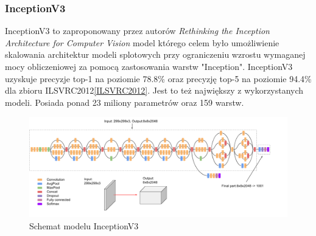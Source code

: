 \documentclass[
    left=2.5cm,         %
    right=2.5cm,        %
    top=2.5cm,          %
    bottom=3cm,         %
    bindingoffset=6mm,  %
    nohyphenation=false %
]{eiti/eiti-thesis}
\begin{document}
        \subsubsection{InceptionV3}\label{InceptionV3}
            InceptionV3 to zaproponowany przez autorów
            \textit{Rethinking the Inception Architecture for Computer Vision}\cite{DBLP:journals/corr/SzegedyVISW15}
            model którego celem było umożliwienie skalowania architektur modeli splotowych przy ograniczeniu wzrostu
            wymaganej mocy obliczeniowej za pomocą zastosowania warstw "Inception".
            InceptionV3 uzyskuje precyzje top-1 na poziomie 78.8\% oraz precyzję top-5 na
            poziomie 94.4\% dla zbioru ILSVRC2012\ref{ILSVRC2012}. Jest to też największy z wykorzystanych modeli. Posiada
            ponad 23 miliony parametrów oraz 159 warstw.
            \begin{figure}[H]
            \centring
            \includegraphics[width=\textwidth]{eiti/inceptionv3overview.png}
            \caption{Schemat modelu InceptionV3}
            \end{figure}

\end{document}
